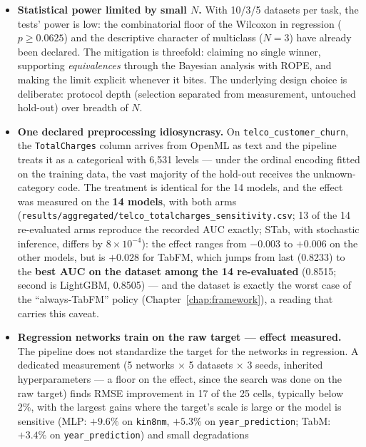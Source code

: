 \begin{itemize}
  \item \textbf{Statistical power limited by small $N$.} With 10/3/5
    datasets per task, the tests' power is low: the combinatorial
    floor of the Wilcoxon in regression ($p \ge 0.0625$) and the
    descriptive character of multiclass ($N=3$) have already been
    declared. The mitigation is threefold: claiming no single
    winner, supporting \emph{equivalences} through the Bayesian
    analysis with ROPE, and making the limit explicit whenever it
    bites. The underlying design choice is deliberate: protocol
    depth (selection separated from measurement, untouched hold-out)
    over breadth of $N$.
  \item \textbf{One declared preprocessing idiosyncrasy.} On
    \texttt{telco\_customer\_churn}, the \texttt{TotalCharges}
    column arrives from OpenML as text and the pipeline treats it as
    a categorical with 6{,}531 levels --- under the ordinal encoding
    fitted on the training data, the vast majority of the hold-out
    receives the unknown-category code. The treatment is identical
    for the 14 models, and the effect was measured on
    the \textbf{14 models}, with both arms
    (\texttt{results/\allowbreak aggregated/\allowbreak telco\_\allowbreak totalcharges\_\allowbreak sensitivity.csv};
    13 of the 14 re-evaluated arms reproduce the recorded AUC
    exactly; STab, with stochastic inference, differs by
    $8\times10^{-4}$): the effect ranges from $-0.003$ to $+0.006$
    on the other models, but is $+0.028$ for TabFM, which jumps from
    last (0.8233) to the \textbf{best AUC on the dataset among the
    14 re-evaluated} (0.8515; second is LightGBM, 0.8505) --- and
    the dataset is exactly the worst case of the ``always-TabFM''
    policy (Chapter~\ref{chap:framework}), a reading that carries
    this caveat.
  \item \textbf{Regression networks train on the raw target ---
    effect measured.} The pipeline does not standardize the target
    for the networks in regression. A dedicated measurement (5
    networks $\times$ 5 datasets $\times$ 3 seeds, inherited
    hyperparameters --- a floor on the effect, since the search was
    done on the raw target) finds RMSE improvement in 17 of the 25
    cells, typically below 2\%, with the largest gains where the
    target's scale is large or the model is sensitive (MLP:
    $+9.6\%$ on \texttt{kin8nm}, $+5.3\%$ on
    \texttt{year\_\allowbreak prediction}; TabM: $+3.4\%$ on
    \texttt{year\_\allowbreak prediction}) and small degradations

\end{itemize}
